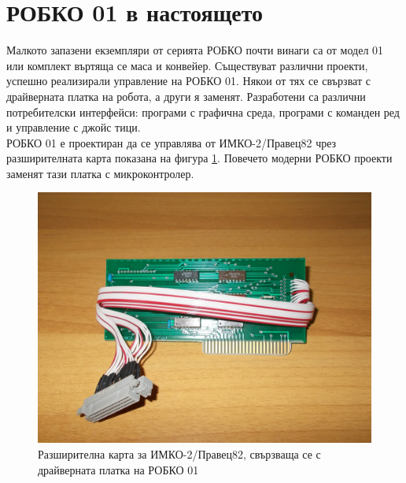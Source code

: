 \section{РОБКО 01 в настоящето}
Малкото запазени екземпляри от серията РОБКО почти винаги са от модел 01 или комплект въртяща се маса и конвейер. Съществуват различни проекти, успешно реализирали управление на РОБКО 01. Някои от тях се свързват с драйверната платка на робота, а други я заменят. Разработени са различни потребителски интерфейси: програми с графична среда, програми с команден ред и управление с джойс
тици.\\\indent{}
РОБКО 01 е проектиран да се управлява от ИМКО-2/Правец82 чрез разширителната карта показана на фигура \ref{fig:orig_cntrl}. Повечето модерни РОБКО проекти заменят тази платка с микроконтролер.\\
\begin{figure}
    \centering
    \includegraphics[width=\linewidth]{pictures/robko_orig_controller.jpg}
    \caption{Разширителна карта за ИМКО-2/Правец82, свързваща се с драйверната платка на РОБКО 01}
    \label{fig:orig_cntrl}
\end{figure}


